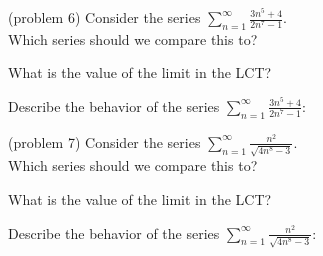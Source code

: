 \documentclass[handout]{ximera}
\begin{document}
\begin{problem}(problem 6)
Consider the series $\displaystyle{\sum_{n=1}^\infty \frac{3n^5 + 4}{2n^7 - 1}}$.\\
Which series should we compare this to?

\begin{multipleChoice}
\end{multipleChoice}

What is the value of the limit in the LCT?
\begin{multipleChoice}
\end{multipleChoice}

Describe the behavior of the series $\displaystyle{\sum_{n=1}^\infty \frac{3n^5 + 4}{2n^7 - 1}:}$
\begin{multipleChoice}
\end{multipleChoice}

\end{problem}


\begin{problem}(problem 7)
Consider the series $\displaystyle{\sum_{n=1}^\infty \frac{n^2}{\sqrt{4n^8 - 3}}}$.\\
Which series should we compare this to?

\begin{multipleChoice}
\end{multipleChoice}

What is the value of the limit in the LCT?
\begin{multipleChoice}
\end{multipleChoice}

Describe the behavior of the series $\displaystyle{\sum_{n=1}^\infty \frac{n^2}{\sqrt{4n^8 - 3}}:}$
\begin{multipleChoice}
\end{multipleChoice}

\end{problem}
\end{document}
